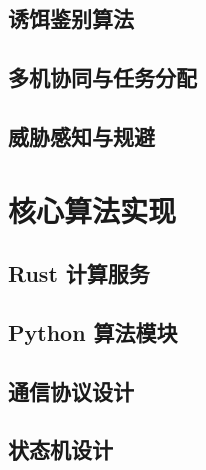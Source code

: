 \documentclass[openany,12pt,UTF8]{ctexbook}
\begin{document}

\section{诱饵鉴别算法}


\section{多机协同与任务分配}


\section{威胁感知与规避}


\chapter{核心算法实现}

\section{Rust 计算服务}


\section{Python 算法模块}


\section{通信协议设计}


\section{状态机设计}

\end{document}
